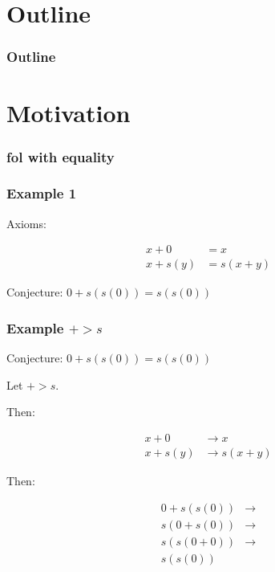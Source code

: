 \documentclass[a4paper]{beamer}
\author[F. Bártek]{Filip Bártek}
\title{\DissertationTitle}
\institute[\FacultyAndUniversityAbbr]{\University}
\date{\today}
\begin{document}
\begin{frame}
\titlepage
\end{frame}

\section*{Outline}
\begin{frame}%
\frametitle{Outline}
\tableofcontents
\end{frame}

\section{Motivation}

\begin{frame}
\frametitle{\Gls{fol} with equality}
\end{frame}

\begin{frame}
\frametitle{Example 1}

Axioms:

\begin{align}
x + 0 &= x\\
x + s(y) &= s(x + y)
\end{align}

Conjecture: $0 + s(s(0)) = s(s(0))$
\end{frame}

\begin{frame}
\frametitle{Example $+ > s$}

Conjecture: $0 + s(s(0)) = s(s(0))$

Let $+ > s$.

Then:

\begin{align}
x + 0 &\to x\\
x + s(y) &\to s(x + y)
\end{align}

Then:

\begin{align}
0 + s(s(0)) &\to\\
s(0 + s(0)) &\to\\
s(s(0 + 0)) &\to\\
s(s(0))
\end{align}

\end{frame}
\end{document}
